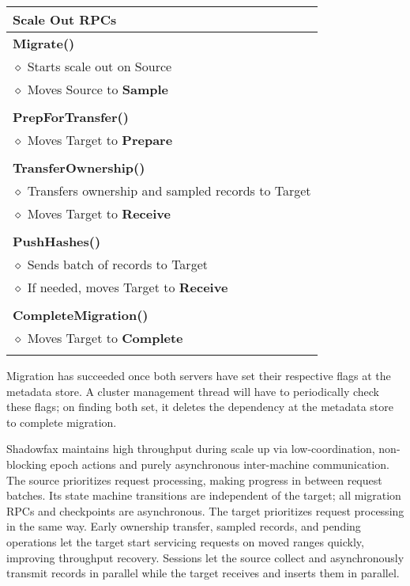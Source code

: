 \begin{table}[t]
\small
\begin{tabular}[]{p{}}
\toprule
\textbf{Scale Out RPCs} \\
\midrule
\textbf{Migrate()} \\
  \hspace{1em} $\diamond$ Starts scale out on Source \\
  \hspace{1em} $\diamond$ Moves Source to \textbf{Sample} \\
  \\
\textbf{PrepForTransfer()} \\
  \hspace{1em} $\diamond$ Moves Target to \textbf{Prepare} \\
  \\
\textbf{TransferOwnership()} \\
  \hspace{1em} $\diamond$ Transfers ownership
    and sampled records to Target \\
  \hspace{1em} $\diamond$ Moves Target to \textbf{Receive} \\
  \\
\textbf{PushHashes()} \\
  \hspace{1em} $\diamond$ Sends batch of records to Target \\
  \hspace{1em} $\diamond$ If needed, moves Target to \textbf{Receive} \\
  \\
\textbf{CompleteMigration()} \\
  \hspace{1em} $\diamond$ Moves Target to \textbf{Complete} \\
  \\
\bottomrule
\end{tabular}
\caption{}
\label{table:rpc}
\end{table}
\fi

Migration has succeeded once both servers have set their respective
flags at the metadata store.
%
A cluster management thread will have to periodically check these flags;
%
on finding both set, it deletes the
dependency at the metadata store to complete migration.

Shadowfax maintains high throughput during
scale up via low-coordination, non-blocking
epoch actions and purely asynchronous inter-machine communication.
%
The source prioritizes request processing, making progress in between request batches.
%
Its state machine transitions are independent of the target; all
migration RPCs and checkpoints are asynchronous.
%
The target prioritizes request processing in the same way.
%
Early ownership transfer, sampled records, and pending operations
let the target start servicing requests on moved ranges
quickly, improving throughput recovery.
%
Sessions let the source collect and
asynchronously transmit records in parallel while the target receives
and inserts them in parallel.

